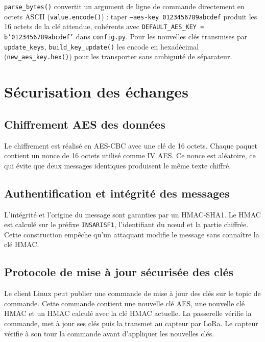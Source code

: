 \documentclass[a4paper,11pt]{report}
\begin{document}
\begin{explication}
\texttt{parse\_bytes()} convertit un argument de ligne de commande directement en octets ASCII
(\texttt{value.encode()}) : taper \texttt{--aes-key 0123456789abcdef} produit les 16 octets de la clé
attendue, cohérents avec \texttt{DEFAULT\_AES\_KEY = b'0123456789abcdef'} dans \texttt{config.py}.
Pour les nouvelles clés transmises par \texttt{update\_keys}, \texttt{build\_key\_update()} les encode en
hexadécimal (\texttt{new\_aes\_key.hex()}) pour les transporter sans ambiguïté de séparateur.
\end{explication}


\chapter{Sécurisation des échanges}
\label{chap:securite}

\section{Chiffrement AES des données}
Le chiffrement est réalisé en AES-CBC avec une clé de 16 octets. Chaque paquet contient un nonce de
16 octets utilisé comme IV AES. Ce nonce est aléatoire, ce qui évite que deux messages identiques
produisent le même texte chiffré.

\section{Authentification et intégrité des messages}
L'intégrité et l'origine du message sont garanties par un HMAC-SHA1. Le HMAC est calculé sur le préfixe
\texttt{INSARISF1}, l'identifiant du nœud et la partie chiffrée. Cette construction empêche qu'un
attaquant modifie le message sans connaître la clé HMAC.

\section{Protocole de mise à jour sécurisée des clés}
Le client Linux peut publier une commande de mise à jour des clés sur le topic de commande. Cette
commande contient une nouvelle clé AES, une nouvelle clé HMAC et un HMAC calculé avec la clé HMAC
actuelle. La passerelle vérifie la commande, met à jour ses clés puis la transmet au capteur par LoRa.
Le capteur vérifie à son tour la commande avant d'appliquer les nouvelles clés.
\end{document}
